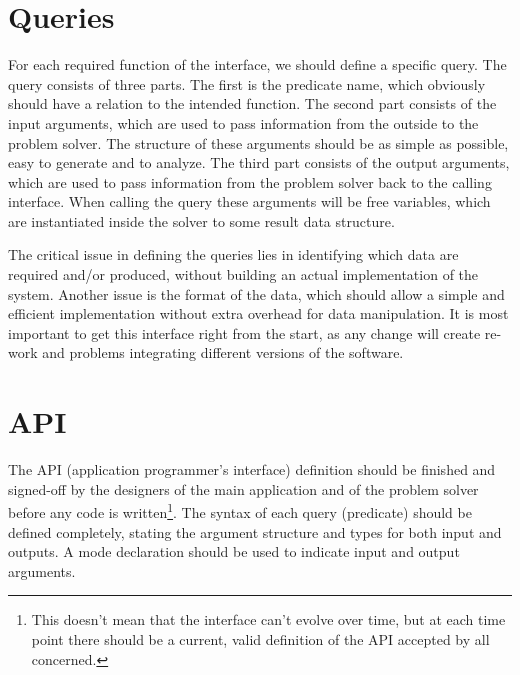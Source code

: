 \documentclass[a4paper,12pt]{report}
\begin{document}
\section{Queries}
For each required function of the interface, we should define a specific query. The query consists of three parts. The first is the predicate name, which obviously should have a relation to the intended function. The second part consists of the input arguments, which are used to pass information from the outside to the problem solver. The structure of these arguments should be as simple as possible, easy to generate and to analyze. The third part consists of the output arguments, which are used to pass information from the problem solver back to the calling interface. When calling the query these arguments will be free variables, which are instantiated inside the solver to some result data structure.
 
The critical issue in defining the queries lies in identifying which data are required and/or produced, without building an actual implementation of the system. Another issue is the format of the data, which should allow a simple and efficient implementation without extra overhead for data manipulation. It is most important to get this interface right from the start, as any change will create re-work and problems integrating different versions of the software.

\section{API}
The API (application programmer's interface) definition should be finished and signed-off by the designers of the main application and of the problem solver before any code is written\footnote{This doesn't mean that the interface can't evolve over time, but at each time point there should be a current, valid definition of the API accepted by all concerned.}. The syntax of each query (predicate) should be defined completely, stating the argument structure and types for both input and outputs. A mode declaration should be used to indicate input and output arguments.
   
\end{document}
